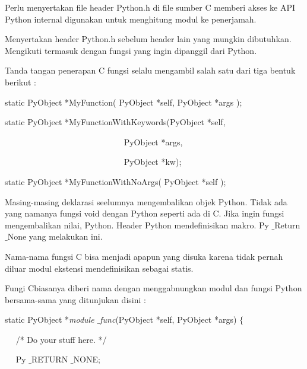 \par
\vspace{12pt}
Perlu menyertakan file header Python.h di file sumber C memberi akses ke API Python internal digunakan untuk menghitung modul ke penerjamah. \par
Menyertakan header Python.h sebelum header lain yang mungkin dibutuhkan. Mengikuti termasuk dengan fungsi yang ingin dipanggil dari Python. \par
Tanda tangan penerapan C fungsi selalu mengambil salah satu dari tiga bentuk berikut : \par
\noindent 
{\fontsize{10pt}{10pt}\selectfont static PyObject *MyFunction( PyObject *self, PyObject *args );} \par
\noindent 
\vspace{10pt}
\noindent 
{\fontsize{10pt}{10pt}\selectfont static PyObject *MyFunctionWithKeywords(PyObject *self,} \par
\noindent 
{\fontsize{10pt}{10pt}\selectfont ~~~~~~~~~~~~~~~~~~~~~~~~~~~~ PyObject *args,} \par
\noindent 
{\fontsize{10pt}{10pt}\selectfont ~~~~~~~~~~~~~~~~~~~~~~~~~~~~ PyObject *kw);} \par
\noindent 
\vspace{10pt}
\noindent 
{\fontsize{10pt}{10pt}\selectfont static PyObject *MyFunctionWithNoArgs( PyObject *self );} \par
\vspace{12pt}
\noindent 
 \hspace*{0.5in} Masing-masing deklarasi seelumnya mengembalikan objek Python. Tidak ada yang namanya fungsi void dengan Python seperti ada di C. Jika ingin fungsi mengembalikan nilai, Python. Header Python mendefinisikan makro. Py $  \_  $Return $  \_  $None yang melakukan ini. \par
\noindent 
 \hspace*{0.5in} Nama-nama fungsi C bisa menjadi apapun yang disuka karena tidak pernah diluar modul ekstensi mendefinisikan sebagai statis. \par
\noindent 
 \hspace*{0.5in} Fungi Cbiasanya diberi nama dengan menggabnungkan modul dan fungsi Python bersama-sama yang ditunjukan disini : \par
\noindent 
static PyObject *\textit{module $  \_  $func}(PyObject *self, PyObject *args)  $  \{  $ \par
\noindent 
~~ /* Do your stuff here. */ \par
\noindent 
~~ Py $  \_  $RETURN $  \_  $NONE; \par
